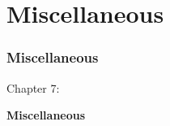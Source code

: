 %

\section{Miscellaneous}
\begin{frame}[fragile]
	\frametitle{Miscellaneous}

	\begin{center}\huge{Chapter 7:}\end{center}
	\begin{center}\huge{\color{typo3darkgrey}\textbf{Miscellaneous}}\end{center}

\end{frame}

